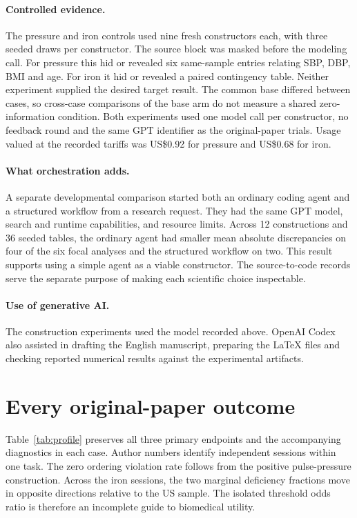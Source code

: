 \paragraph{Controlled evidence.}
The pressure and iron controls used nine fresh constructors each, with three seeded draws per constructor. The source block was masked before the modeling call. For pressure this hid or revealed six same-sample entries relating SBP, DBP, BMI and age. For iron it hid or revealed a paired contingency table. Neither experiment supplied the desired target result. The common base differed between cases, so cross-case comparisons of the base arm do not measure a shared zero-information condition. Both experiments used one model call per constructor, no feedback round and the same GPT identifier as the original-paper trials. Usage valued at the recorded tariffs was US\$0.92 for pressure and US\$0.68 for iron.

\paragraph{What orchestration adds.}
A separate developmental comparison started both an ordinary coding agent and a structured workflow from a research request. They had the same GPT model, search and runtime capabilities, and resource limits. Across 12 constructions and 36 seeded tables, the ordinary agent had smaller mean absolute discrepancies on four of the six focal analyses and the structured workflow on two. This result supports using a simple agent as a viable constructor. The source-to-code records serve the separate purpose of making each scientific choice inspectable.

\paragraph{Use of generative AI.}
The construction experiments used the model recorded above. OpenAI Codex also assisted in drafting the English manuscript, preparing the \LaTeX{} files and checking reported numerical results against the experimental artifacts.

\section{Every original-paper outcome}
\label{app:profiles}
Table~\ref{tab:profile} preserves all three primary endpoints and the accompanying diagnostics in each case. Author numbers identify independent sessions within one task. The zero ordering violation rate follows from the positive pulse-pressure construction. Across the iron sessions, the two marginal deficiency fractions move in opposite directions relative to the US sample. The isolated threshold odds ratio is therefore an incomplete guide to biomedical utility.

